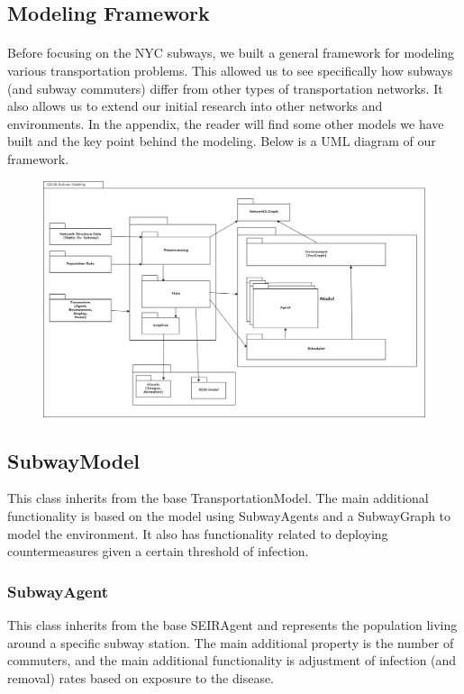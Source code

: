 \documentclass[12pt, a4, epsf] {article}
\theoremstyle{plain}
\theoremstyle{definition}
\begin{document}
\subsection{Modeling Framework}
\paragraph{}
Before focusing on the NYC subways, we built a general framework for modeling various transportation problems. This allowed us to see specifically how subways (and subway commuters) differ from other types of transportation networks. It also allows us to extend our initial research into other networks and environments. In the appendix, the reader will find some other models we have built and the key point behind the modeling. Below is a UML diagram of our framework.
\begin{figure}[htbp]
\includegraphics[width = 1.0\textwidth]{Scratch_Visuals/covid_subway.png}
\end{figure}
\subsection{SubwayModel}
This class inherits from the base TransportationModel. The main additional functionality is based on the model using SubwayAgents and a SubwayGraph to model the environment. It also has functionality related to deploying countermeasures given a certain threshold of infection. 
\subsubsection{SubwayAgent}
This class inherits from the base SEIRAgent and represents the population living around a specific subway station. The main additional property is the number of commuters, and the main additional functionality is adjustment of infection (and removal) rates based on exposure to the disease.
\end{document}
